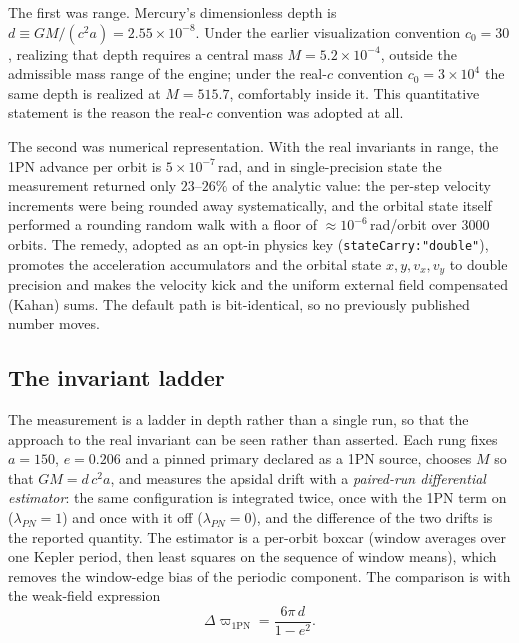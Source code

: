 \documentclass[aps,reprint,amsmath,amssymb,nofootinbib,superscriptaddress,floatfix]{revtex4-2}
\begin{document}
The first was range.
Mercury's dimensionless depth is
$d\equiv GM/(c^{2}a)=2.55\times10^{-8}$.
Under the earlier visualization convention $c_0=30$, realizing that
depth requires a central mass $M=5.2\times10^{-4}$, outside the
admissible mass range of the engine; under the real-$c$ convention
$c_0=3\times10^{4}$ the same depth is realized at $M=515.7$, comfortably
inside it.
This quantitative statement is the reason the real-$c$ convention was
adopted at all.

The second was numerical representation.
With the real invariants in range, the 1PN advance per orbit is
$5\times10^{-7}$\,rad, and in single-precision state the measurement
returned only $23$--$26\%$ of the analytic value: the per-step velocity
increments were being rounded away systematically, and the orbital
state itself performed a rounding random walk with a floor of
$\approx10^{-6}$\,rad/orbit over $3000$ orbits.
The remedy, adopted as an opt-in physics key
(\texttt{stateCarry:"double"}), promotes the acceleration accumulators
and the orbital state $x,y,v_x,v_y$ to double precision and makes the
velocity kick and the uniform external field compensated (Kahan) sums.
The default path is bit-identical, so no previously published number
moves.

\subsection{The invariant ladder}
\label{sec:p1ladder}

The measurement is a ladder in depth rather than a single run, so that
the approach to the real invariant can be seen rather than asserted.
Each rung fixes $a=150$, $e=0.206$ and a pinned primary declared as a
1PN source, chooses $M$ so that $GM=d\,c^{2}a$, and measures the
apsidal drift with a \emph{paired-run differential estimator}: the same
configuration is integrated twice, once with the 1PN term on
($\lambda_{PN}=1$) and once with it off ($\lambda_{PN}=0$), and the
difference of the two drifts is the reported quantity.
The estimator is a per-orbit boxcar (window averages over one Kepler
period, then least squares on the sequence of window means), which
removes the window-edge bias of the periodic component.
The comparison is with the weak-field expression
\begin{equation}
  \Delta\varpi_{1\mathrm{PN}} = \frac{6\pi\,d}{1-e^{2}} .
  \label{eq:1pn}
\end{equation}
\end{document}
